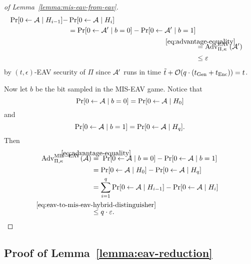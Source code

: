 \begin{proof}[of Lemma~\ref{lemma:mis-eav-from-eav}]
\begin{align}
		\begin{split}
			\begin{split}
				\pr{0 \from \adv \mid H_{i - 1}} - & \pr{0 \from \adv \mid H_{i}} \\
				& = \pr{0 \from \adv' \mid b = 0} - \pr{0 \from \adv' \mid b = 1}
			\end{split} \\
			& \stackrel{\mathclap{\eqref{eq:advantage-equality}}}{=} \advantage{\Pi}{\kappa}{EAV}(\adv')                                         \\
			& \le \epsilon
		\end{split}
	\end{align}
	by $(t, \epsilon)$-EAV security of $\Pi$ since $\mathcal{A}'$ runs in time $\tilde{t} + \mathcal{O}(q \cdot (t_{\mathrm{Gen}} + t_{\mathrm{Enc}})) = t$.

	Now let $b$ be the bit sampled in the MIS-EAV game. Notice that
	\[
		\pr{0 \from \adv \mid b = 0} = \pr{0 \from \adv \mid H_0}
	\]
	and
	\[
		\pr{0 \from \adv \mid b = 1} = \pr{0 \from \adv \mid H_q}.
	\]
	Then
	\begin{align*}
		\advantage{\Pi}{\kappa}{MIS-EAV}(\adv) & \stackrel{\mathclap{\eqref{eq:advantage-equality}}}{=} \; \pr{0 \from \adv \mid b = 0} - \pr{0 \from \adv \mid b = 1} \\
		                                       & = \pr{0 \from \adv \mid H_0} - \pr{0 \from \adv \mid H_q}                                                             \\
		                                       & = \sum_{i = 1}^{q} \pr{0 \from \adv \mid H_{i - 1}} - \pr{0 \from \adv \mid H_i}                                      \\
		                                       & \stackrel{\mathclap{\eqref{eq:eav-to-mis-eav-hybrid-distinguisher}}}{\le} q \cdot \epsilon.
	\end{align*}
\end{proof}

\subsection{Proof of Lemma~\ref{lemma:eav-reduction}} \label{sec:eav-reduction-proof}

